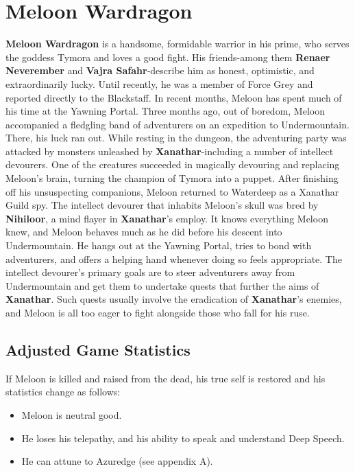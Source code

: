 \documentclass[10pt,a4paper,twoside,twocolumn,openany,nodeprecatedcode]{dndbook}
\begin{document}
\section{Meloon Wardragon}
\textbf{Meloon Wardragon} is a handsome, formidable warrior in his prime, who serves the goddess Tymora and loves a good fight. His friends-among them \textbf{Renaer Neverember} and \textbf{Vajra Safahr}-describe him as honest, optimistic, and extraordinarily lucky. Until recently, he was a member of Force Grey and reported directly to the Blackstaff. In recent months, Meloon has spent much of his time at the Yawning Portal.
Three months ago, out of boredom, Meloon accompanied a fledgling band of adventurers on an expedition to Undermountain. There, his luck ran out. While resting in the dungeon, the adventuring party was attacked by monsters unleashed by \textbf{Xanathar}-including a number of intellect devourers. One of the creatures succeeded in magically devouring and replacing Meloon's brain, turning the champion of Tymora into a puppet. After finishing off his unsuspecting companions, Meloon returned to Waterdeep as a Xanathar Guild spy.
The intellect devourer that inhabits Meloon's skull was bred by \textbf{Nihiloor}, a mind flayer in \textbf{Xanathar}'s employ. It knows everything Meloon knew, and Meloon behaves much as he did before his descent into Undermountain. He hangs out at the Yawning Portal, tries to bond with adventurers, and offers a helping hand whenever doing so feels appropriate. The intellect devourer's primary goals are to steer adventurers away from Undermountain and get them to undertake quests that further the aims of \textbf{Xanathar}. Such quests usually involve the eradication of \textbf{Xanathar}'s enemies, and Meloon is all too eager to fight alongside those who fall for his ruse.
\subsection{Adjusted Game Statistics}
If Meloon is killed and raised from the dead, his true self is restored and his statistics change as follows:
\begin{itemize}

\item Meloon is neutral good.
\item He loses his telepathy, and his ability to speak and understand Deep Speech.
\item He can attune to Azuredge (see appendix A).
\end{itemize}
\end{document}
